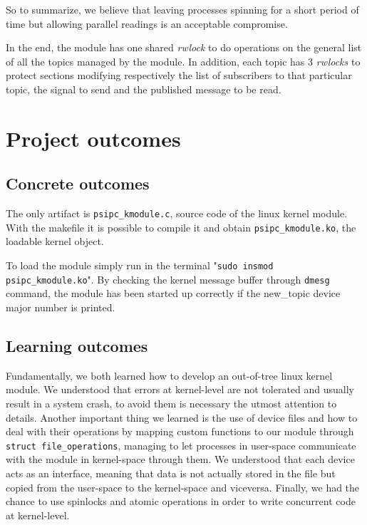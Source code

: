 \documentclass[10pt,a4]{article}
\newcommand{\code}[1]{\texttt{#1}}
\begin{document}
So to summarize, we believe that leaving processes spinning for a short period of time but allowing parallel readings is an acceptable compromise.

In the end, the module has one shared \textit{rwlock} to do operations on the general list of all the topics managed by the module. In addition, each topic has 3 \textit{rwlocks} to protect sections modifying respectively the list of subscribers to that particular topic, the signal to send and the published message to be read.


\section{Project outcomes}

\subsection{Concrete outcomes}
The only artifact is \code{psipc\_kmodule.c}, source code of the linux kernel module.
With the makefile it is possible to compile it and obtain \code{psipc\_kmodule.ko}, the loadable kernel object.

To load the module simply run in the terminal "\code{sudo insmod psipc\_kmodule.ko}". By checking the kernel message buffer through \code{dmesg} command, the module has been started up correctly if the new\_topic device major number is printed.

\subsection{Learning outcomes}

Fundamentally, we both learned how to develop an out-of-tree linux kernel module.
We understood that errors at kernel-level are not tolerated and usually result in a system crash, to avoid them is necessary the utmost attention to details.
Another important thing we learned is the use of device files and how to deal with their operations by mapping custom functions to our module through \code{struct file\_operations}, managing to let processes in user-space communicate with the module in kernel-space through them.
We understood that each device acts as an interface, meaning that data is not actually stored in the file but copied from the user-space to the kernel-space and viceversa.
Finally, we had the chance to use spinlocks and atomic operations in order to write concurrent code at kernel-level.
\end{document}
